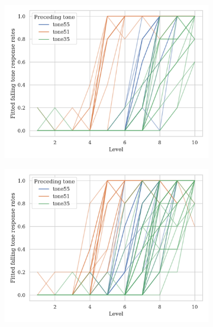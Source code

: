 \begin{figure}[hbt!]
\centering
\begin{subfigure}[b]{.45\textwidth}
\centering
\includegraphics[width=\textwidth]{figures/E2/Mandarin_monolingual_E2_raw.png}
\end{subfigure}
\hfill
\begin{subfigure}[b]{.45\textwidth}
\centering
\includegraphics[width=\textwidth]{figures/E2/Mandarin_bilingual_E2_raw.png}
\end{subfigure}
\hfill
\begin{subfigure}[b]{.45\textwidth}
\centering

\end{subfigure}
\end{figure}
